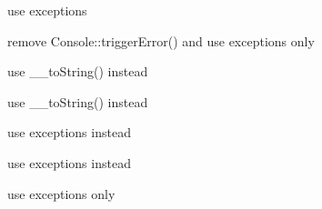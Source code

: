 
\begin{DoxyRefList}
\item[\label{todo__todo000003}%
\hypertarget{todo__todo000003}{}%
\-Global \hyperlink{class_p_e_a_r2_1_1_console_1_1_command_line_1_1_argument_a184909dab34698899937d810a9f5d393}{\-Argument} ()]use exceptions  
\item[\label{todo__todo000010}%
\hypertarget{todo__todo000010}{}%
\-Global \hyperlink{class_p_e_a_r2_1_1_console_1_1_command_line_a7d983b16c2cb57cefa229686c486a8f9}{\-Command\-Line} (\$msg\-Id, \$level, \$params=array())]remove \-Console\-::trigger\-Error() and use exceptions only  
\item[\label{todo__todo000004}%
\hypertarget{todo__todo000004}{}%
\-Global \hyperlink{class_p_e_a_r2_1_1_console_1_1_command_line_1_1_element_a5558c5d549f41597377fa1ea8a1cefa3}{\-Element} ()]use \-\_\-\-\_\-to\-String() instead  
\item[\label{todo__todo000005}%
\hypertarget{todo__todo000005}{}%
\-Global \hyperlink{class_p_e_a_r2_1_1_console_1_1_command_line_1_1_option_ac6a71376be3fe914f3ff1c0f7a438064}{\-Option} (\$delim=\char`\"{}, \char`\"{})]use \-\_\-\-\_\-to\-String() instead  
\item[\label{todo__todo000006}%
\hypertarget{todo__todo000006}{}%
\-Global \hyperlink{class_p_e_a_r2_1_1_console_1_1_command_line_1_1_option_a184909dab34698899937d810a9f5d393}{\-Option} ()]use exceptions instead  
\item[\label{todo__todo000001}%
\hypertarget{todo__todo000001}{}%
\-Global \hyperlink{class_hypo_conf_1_1_config_parser_1_1_setting_a184909dab34698899937d810a9f5d393}{\-Setting} ()]use exceptions instead  
\item[\label{todo__todo000007}%
\hypertarget{todo__todo000007}{}%
\-Global \hyperlink{class_p_e_a_r2_1_1_console_1_1_command_line_1_1_xml_parser_a94aac519f29e177fa747400ceafc6a39}{\-Xml\-Parser} (\$doc)]use exceptions only 
\end{DoxyRefList}